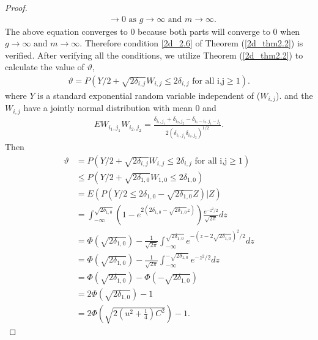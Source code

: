 \documentclass{article}
\begin{document}
\begin{appendices}
\begin{proof}
\begin{equation*}
\begin{aligned}
				&\rightarrow 0 \text{ as }g\rightarrow\infty \text{ and } m\rightarrow\infty.
			\end{aligned}
		\end{equation*}
		The above equation converges to 0 because both parts will converge to 0 when $g\rightarrow\infty \text{ and } m\rightarrow\infty$. Therefore condition \ref{2d_2.6} of Theorem (\ref{2d_thm2.2}) is verified. After verifying all the conditions, we utilize Theorem (\ref{2d_thm2.2}) to calculate the value of $\vartheta$,
		\begin{equation*}
			\begin{aligned}
				\vartheta=P(Y/2+\sqrt{2\delta_{i,j}}W_{i,j}\leq2\delta_{i,j}\text{ for all i,j}\geq1).
			\end{aligned} 
		\end{equation*}
		where $Y$ is a standard exponential random variable independent of ($W_{i,j}$). and the $W_{i,j}$ have a jointly normal distribution with mean 0 and 
		\begin{equation*}
			\begin{aligned}
				EW_{i_1,j_1}W_{i_2,j_2}=\frac{\delta_{i_1,j_1}+\delta_{i_2,j_2}-\delta_{i_1-i_2,j_1-j_2}}{2(\delta_{i_1,j_1}\delta_{i_2,j_2})^{1/2}}.
			\end{aligned} 
		\end{equation*}
		Then
		\begin{equation*}
			\begin{aligned}
				\vartheta&=P(Y/2+\sqrt{2\delta_{i,j}}W_{i,j}\leq2\delta_{i,j}\text{ for all i,j}\geq1)\\
				&\leq P(Y/2+\sqrt{2\delta_{1,0}}W_{1,0}\leq2\delta_{1,0})\\
				&=E(P(Y/2\leq 2\delta_{1,0}-\sqrt{2\delta_{1,0}}Z)|Z)\\
				&= \int_{-\infty}^{\sqrt{2\delta_{1,0}}}(1-e^{2(2\delta_{1,0}-\sqrt{2\delta_{1,0}}z)})\frac{e^{-z^2/2}}{\sqrt{2\pi}} dz  \\
				&= \Phi(\sqrt{2\delta_{1,0}})-\frac{1}{\sqrt{2\pi}}\int_{-\infty}^{\sqrt{2\delta_{1,0}}} e^{-(z-2\sqrt{2\delta_{1,0}})^2/2}dz \\
				&= \Phi(\sqrt{2\delta_{1,0}})-\frac{1}{\sqrt{2\pi}}\int_{-\infty}^{-\sqrt{2\delta_{1,0}}} e^{-z^2/2}dz \\
				&= \Phi(\sqrt{2\delta_{1,0}})-\Phi(-\sqrt{2\delta_{1,0}}) \\
				&=2\Phi(\sqrt{2\delta_{1,0}})-1\\
				&=2\Phi(\sqrt{2(u^2+\frac{1}{4})C^2})-1.
			\end{aligned} 
		\end{equation*}
		

\end{proof}
\end{appendices}
\end{document}

